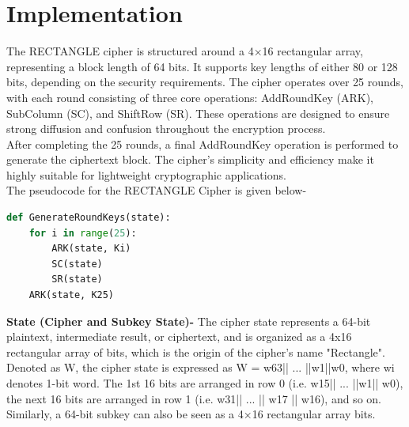 \documentclass[journal=tosc,preprint]{iacrtrans}
\begin{document}
\section{Implementation}
 The RECTANGLE cipher is structured around a 4×16 rectangular array, representing a block length of 64 bits. It supports key lengths of either 80 or 128 bits, depending on the security requirements. The cipher operates over 25 rounds, with each round consisting of three core operations: AddRoundKey (ARK), SubColumn (SC), and ShiftRow (SR). These operations are designed to ensure strong diffusion and confusion throughout the encryption process.\\
 After completing the 25 rounds, a final AddRoundKey operation is performed to generate the ciphertext block. The cipher's simplicity and efficiency make it highly suitable for lightweight cryptographic applications.\\
 The pseudocode for the RECTANGLE Cipher is given below-
\begin{lstlisting}[language=Python]
def GenerateRoundKeys(state):
    for i in range(25):
        ARK(state, Ki)
        SC(state)
        SR(state)
    ARK(state, K25)
\end{lstlisting}
\textbf{State (Cipher and Subkey State)-} The cipher state represents a 64-bit plaintext, intermediate result, or ciphertext, and is organized as a 4x16 rectangular array of bits, which is the origin of the cipher's name "Rectangle". Denoted as W, the cipher state is expressed as W = w63|| ... ||w1||w0, where wi denotes 1-bit
 word. The 1st 16 bits are arranged in row 0 (i.e. w15|| ... ||w1|| w0), the next 16 bits are arranged in row 1 (i.e. w31|| ... || w17 || w16), and so on. Similarly, a 64-bit subkey can also be seen as a 4×16 rectangular array bits.
\end{document}
